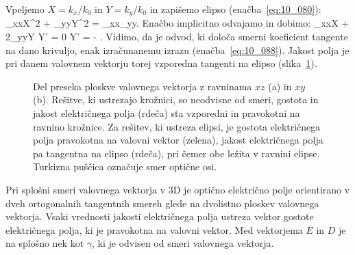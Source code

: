 Vpeljemo $X = k_x/k_0$ in $Y = k_y/k_0$
in zapišemo elipso (enačba~\ref{eq:10_080}):
\beq
\varepsilon_{xx}X^2 + \varepsilon_{yy}Y^2 = \varepsilon_{xx}\varepsilon_{yy}.
\label{eq:10_089}
\eeq
Enačbo implicitno odvajamo in dobimo:
\varepsilon_{xx}X + 2\varepsilon_{yy}Y Y' = 0 \qquad \Longrightarrow \qquad 
Y' = -  .
\label{eq:10_090}
\eeq
Vidimo, da je odvod, ki določa smerni koeficient tangente na dano krivuljo, enak
izračunanemu izrazu (enačba~\ref{eq:10_088}). Jakost polja je pri danem valovnem vektorju torej
vzporedna tangenti na elipso (slika~\ref{fig:10_ploskev_tangenta}).
\begin{figure}[h]
\centering
\def\svgwidth{130truemm} 

\caption{Del preseka ploskve valovnega vektorja z ravninama $xz$ (a) in $xy$ (b). 
Rešitve, ki ustrezajo krožnici, so neodvisne od smeri, gostota in jakost 
električnega polja (rdeča) sta vzporedni in pravokotni na ravnino krožnice. 
Za rešitev, ki ustreza elipsi, je gostota električnega polja pravokotna 
na valovni vektor (zelena), jakost električnega polja pa tangentna 
na elipso (rdeča), pri čemer obe ležita v ravnini elipse.
Turkizna puščica označuje smer optične osi.}
\label{fig:10_ploskev_tangenta}
\end{figure}

Pri splošni smeri valovnega vektorja v 3D je optično električno polje orientirano
v dveh ortogonalnih tangentnih smereh glede na dvolistno ploskev valovnega vektorja. Vsaki
vrednosti jakosti električnega polja ustreza vektor gostote električnega polja, ki je pravokotna
na valovni vektor. Med vektorjema $E$ in $D$ je na splošno nek kot $\gamma$, ki je odvisen od smeri valovnega
vektorja.

